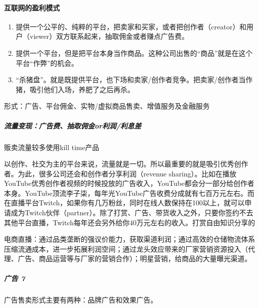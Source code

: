 \documentclass[letterpaper,10pt,english]{sphinxmanual}
\begin{document}
\paragraph{互联网的盈利模式}
\label{\detokenize{chapter_introduction/money:id9}}
%
\begin{footnote}[144]\sphinxAtStartFootnote
{}
%
\end{footnote}
\begin{enumerate}
%
\item {} 
提供一个公平的、纯粹的平台，把卖家和买家，或者把创作者（creator）和用户（viewer）双方联系起来，抽取佣金或者赚点广告费。

\item {} 
提供一个平台，但是把平台本身当作商品。这种公司出售的“商品”就是在这个平台“作弊”的机会。

\item {} 
“杀猪盘”。就是既提供平台，也下场和卖家/创作者竞争。把卖家/创作者当作猪，吸引他们入场，养肥了之后再杀。

\end{enumerate}

形式：广告、平台佣金、实物/虚拟商品售卖、增值服务及金融服务


\subparagraph{流量变现：广告费、抽取佣金or利润/利息差}
\label{\detokenize{chapter_introduction/money:or}}
贩卖流量较多使用kill time产品

以创作、社交为主的平台来说，流量就是一切。所以最重要的就是吸引优秀创作者。为此，很多公司还会和创作者分享利润（revenue
sharing）。比如在播放YouTube优秀创作者视频的时候投放的广告收入，YouTube都会分一部分给创作者本身。YouTube顶流李子柒，每年光YouTube广告收费分成就有七百万元左右。而在直播平台Twitch，如果你有几万粉丝，同时在线人数保持在100以上，就可以申请成为Twitch伙伴（partner）。除了打赏、广告、带货收入之外，只要你签约不去其他平台直播，Twitch每年还会另外给你40万元左右的收入。打赏自由知识分享的

电商直播：通过品类垄断的强议价能力，获取渠道利润；通过高效的仓储物流体系压缩流通成本，进一步拓展利润空间；通过龙头效应带来的厂家营销资源投入（代理、广告、商品运营等与厂家的营销合作）；明星营销，给商品的大量曝光渠道。


\subparagraph{广告 7\sphinxfootnotemark[145]}
\label{\detokenize{chapter_introduction/money:id10}}%
\begin{footnotetext}[145]\sphinxAtStartFootnote
{}
%
\end{footnotetext}\ignorespaces 
广告售卖形式主要有两种：品牌广告和效果广告。
\end{document}
